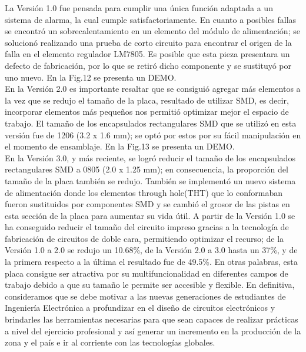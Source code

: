 \documentclass[times, 10pt,twocolumn]{article}
\newcommand{\Img}[5]{
   \begin{figure}[H]
   	   \centering
       \texttt{[image: Img/\#3]}
       \caption{ \centering \textbf{\small #4}}
       \label{#5}
       \end{figure}
   }
\begin{document}
La Versión 1.0 fue pensada para cumplir una única función adaptada a un sistema de alarma, la cual cumple satisfactoriamente. En cuanto a posibles fallas se encontró un sobrecalentamiento en un elemento del módulo de alimentación; se solucionó realizando una prueba de corto circuito para encontrar el origen de la falla en el elemento regulador LM7805. Es posible que esta pieza presentara un defecto de fabricación, por lo que se retiró dicho componente y se sustituyó por uno nuevo. En la Fig.12 se presenta un DEMO.\\
En la Versión 2.0 es importante resaltar que se consiguió agregar más elementos a la vez que se redujo el tamaño de la placa, resultado de utilizar SMD, es decir, incorporar elementos más pequeños nos permitió optimizar mejor el espacio de trabajo. El tamaño de los encapsulados rectangulares SMD que se utilizó en esta versión fue de 1206 (3.2 x 1.6
mm); se optó por estos por su fácil manipulación en el momento de ensamblaje. En la Fig.13 se presenta un DEMO.\\
En la Versión 3.0, y más reciente, se logró reducir el tamaño de los encapsulados rectangulares SMD a 0805 (2.0 x 1.25 mm); en consecuencia, la proporción del tamaño de la placa también se redujo. También se implementó un nuevo sistema de alimentación donde los elementos through hole(THT) que lo conformaban fueron sustituidos por componentes SMD y se cambió el grosor de las pistas en esta sección de la placa para aumentar su vida útil. A partir de la Versión 1.0 se ha conseguido reducir el tamaño del circuito impreso gracias a la tecnología de fabricación de circuitos de doble cara, permitiendo optimizar el recurso; de la Versión 1.0 a 2.0 se redujo un 10.68\%, de la Versión 2.0 a 3.0 hasta un 37\%, y de la primera respecto a la última el resultado fue de 49.5\%. En otras palabras, esta placa consigue ser atractiva por su multifuncionalidad en diferentes campos de trabajo debido a que su tamaño le permite ser accesible y flexible.
En definitiva, consideramos que se debe motivar a las nuevas generaciones de estudiantes de Ingeniería Electrónica a profundizar en el diseño de circuitos electrónicos y brindarles las herramientas necesarias para que sean capaces de realizar prácticas a nivel del ejercicio profesional y así generar un incremento en la producción de la zona y el país e ir al corriente con las tecnologías globales.
\end{document}
